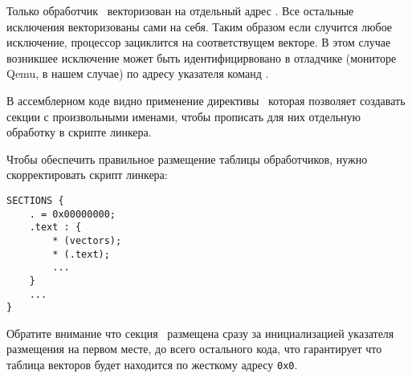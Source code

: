 Только обработчик \ векторизован на отдельный адрес . Все
остальные исключения векторизованы сами на себя. Таким образом если случится любое
исключение, процессор зациклится на соответствущем векторе. В этом случае
возникшее исключение может быть идентифицирвовано в отладчике (мониторе Qemu,
в нашем случае) по адресу указателя команд .

В ассемблерном коде видно применение директивы \ которая позволяет
создавать секции с произвольными именами, чтобы прописать для них отдельную
обработку в скрипте линкера.

Чтобы обеспечить правильное размещение таблицы обработчиков, нужно
скорректировать скрипт линкера: 

\begin{verbatim}
SECTIONS {
	. = 0x00000000;
	.text : {
		* (vectors);
		* (.text); 
		...
	}
	...
}
\end{verbatim}

Обратите внимание что секция \ размещена сразу за инициализацией
указателя размещения на первом месте, до всего остального кода, что гарантирует
что таблица векторов будет находится по жесткому адресу \verb|0x0|.


\secdown
{}
\secup
{}
\secdown
{}
\secup
{}
\label{kumarB}
 
\secup 
